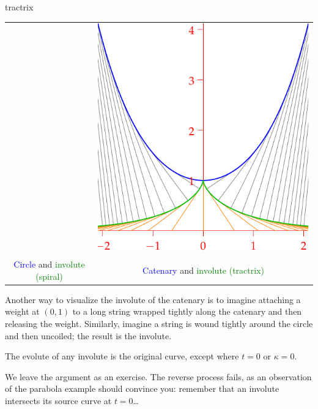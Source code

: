 \begin{examples}{}{tractrix}
\begin{enumerate}
\begin{center}
\begin{tabular}{c@{\qquad\qquad}c}
			&
			\href{http://math.uci.edu/~ndonalds/math162a/radii-invcat.html}{\includegraphics[scale=0.8]{radii-invcat2}}
			\\
			\textcolor{blue}{Circle} and \textcolor{Green}{involute (spiral)}
			&
			\textcolor{blue}{Catenary} and \textcolor{Green}{involute (tractrix)}
		\end{tabular}
	\end{center}
	
Another way to visualize the involute of the catenary is to imagine attaching a weight at $(0,1)$ to a long string wrapped tightly along the catenary and then releasing the weight. Similarly, imagine a string is wound tightly around the circle and then uncoiled; the result is the involute.
\end{enumerate}
\end{examples}



\begin{thm}{}{}
The evolute of any involute is the original curve, except where $t=0$ or $\kappa=0$.
\end{thm}

We leave the argument as an exercise. The reverse process fails, as an observation of the parabola example should convince you: remember that an involute intersects its source curve at $t=0$\ldots

